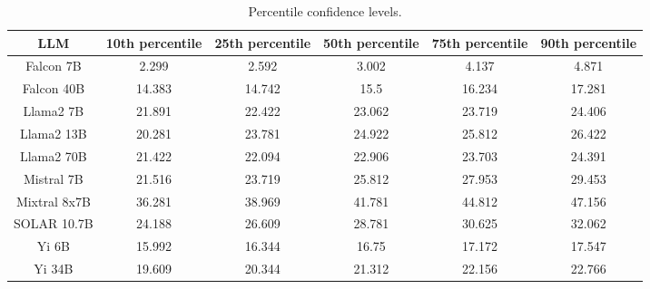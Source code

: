 \begin{table*}
\centering
\begin{tabular}{c|c|c|c|c|c}
LLM & 10th percentile & 25th percentile & 50th percentile & 75th percentile & 90th percentile\\ \hline
Falcon 7B & 2.299 & 2.592 & 3.002 & 4.137 & 4.871\\
Falcon 40B & 14.383 & 14.742 & 15.5 & 16.234 & 17.281\\
Llama2 7B & 21.891 & 22.422 & 23.062 & 23.719 & 24.406\\
Llama2 13B & 20.281 & 23.781 & 24.922 & 25.812 & 26.422\\
Llama2 70B & 21.422 & 22.094 & 22.906 & 23.703 & 24.391\\
Mistral 7B & 21.516 & 23.719 & 25.812 & 27.953 & 29.453\\
Mixtral 8x7B & 36.281 & 38.969 & 41.781 & 44.812 & 47.156\\
SOLAR 10.7B & 24.188 & 26.609 & 28.781 & 30.625 & 32.062\\
Yi 6B & 15.992 & 16.344 & 16.75 & 17.172 & 17.547\\
Yi 34B & 19.609 & 20.344 & 21.312 & 22.156 & 22.766\\
\hline
\end{tabular}
\caption{Percentile confidence levels.}
\label{tab:percentile_conf}
\end{table*}
